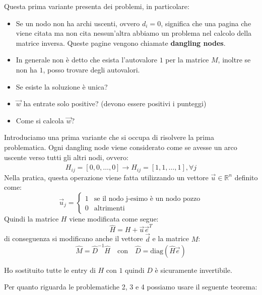 Questa prima variante presenta dei problemi, in particolare:
\begin{itemize}
    \item Se un nodo non ha archi uscenti, ovvero $d_i = 0$, significa che una
          pagina che viene citata ma non cita nessun'altra abbiamo un problema nel
          calcolo della matrice inversa. Queste pagine vengono chiamate \textbf{dangling
              nodes}.
    \item In generale non è detto che esista l'autovalore $1$ per la matrice $M$,
          inoltre se non ha $1$, posso trovare degli autovalori.
    \item Se esiste la soluzione è unica?
    \item $\vec{w}$ ha entrate solo positive? (devono essere positivi i punteggi)
    \item Come si calcola $\vec{w}$?
\end{itemize}
Introduciamo una prima variante che si occupa di risolvere la prima problematica.
Ogni dangling node viene considerato come se avesse un arco uscente verso tutti
gli altri nodi, ovvero:
\begin{equation*}
    H_{ij} = \left[0, 0, \dots, 0\right] \rightarrow \hat{H}_{ij} = \left[1, 1,
        \dots, 1\right], \forall j
\end{equation*}
Nella pratica, questa operazione viene fatta utilizzando un vettore $\vec{u} \in
    \mathbb{R}^n$ definito come:
\begin{equation}
    \vec{u}_j = \begin{cases}
        1 & \text{se il nodo j-esimo è un nodo pozzo} \\
        0 & \text{altrimenti}
    \end{cases}
\end{equation}
Quindi la matrice $H$ viene modificata come segue:
\begin{equation}
    \hat{H} = H + \vec{u} \vec{e}^T
\end{equation}
di conseguenza si modificano anche il vettore $\vec{d}$ e la matrice $M$:
\begin{equation}
    \hat{M} = \hat{D}^{-1} \hat{H} \quad \text{con} \quad \hat{D} = \text{diag}(\hat{H} \vec{e})
\end{equation}
\begin{nota}
    Ho sostituito tutte le entry di $H$ con $1$ quindi $D$ è sicuramente
    invertibile.
\end{nota}
Per quanto riguarda le problematiche 2, 3 e 4 possiamo usare il seguente teorema:
